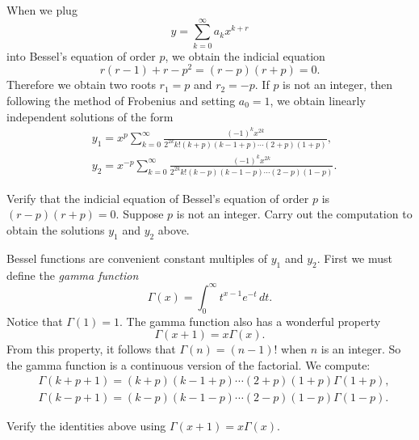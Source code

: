 \documentclass{ximera}
\begin{document}
When we plug
\begin{equation*}
    y = \sum_{k=0}^\infty a_k x^{k+r}
\end{equation*}
into Bessel's equation of order $p$, we obtain the indicial equation
\begin{equation*}
    r(r-1)+r-p^2 = (r-p)(r+p) = 0 .
\end{equation*}
Therefore we obtain two roots $r_1 = p$ and $r_2 = -p$. If $p$ is not an integer, then following the method of Frobenius and setting $a_0 = 1$, we obtain linearly independent solutions of the form
\begin{align*}
    & y_1 = x^p \sum_{k=0}^\infty \frac{{(-1)}^k x^{2k}}{2^{2k} k! (k+p)(k-1+p)\cdots (2+p)(1+p)} , \\
    & y_2 = x^{-p} \sum_{k=0}^\infty \frac{{(-1)}^k x^{2k}}{2^{2k} k! (k-p)(k-1-p)\cdots (2-p)(1-p)} .
\end{align*}

\begin{exercise}
    \begin{tasks}
        \task Verify that the indicial equation of Bessel's equation of order $p$ is $(r-p)(r+p)=0$.
        \task Suppose $p$ is not an integer.  Carry out the computation to obtain the solutions $y_1$ and $y_2$ above.
    \end{tasks}
\end{exercise}

Bessel functions are convenient constant multiples of $y_1$ and $y_2$. First we must define the \emph{gamma function}
\begin{equation*}
    \Gamma(x) = \int_0^\infty t^{x-1} e^{-t} \, dt .
\end{equation*}
Notice that $\Gamma(1) = 1$. The gamma function also has a wonderful property
\begin{equation*}
    \Gamma(x+1) = x \Gamma(x) .
\end{equation*}
From this property, it follows that $\Gamma(n) = (n-1)!$ when $n$ is an integer.  So the gamma function is a continuous version of the factorial.  We compute:
\begin{align*}
    & \Gamma(k+p+1)=(k+p)(k-1+p)\cdots (2+p)(1+p) \Gamma(1+p) ,\\
    & \Gamma(k-p+1)=(k-p)(k-1-p)\cdots (2-p)(1-p) \Gamma(1-p) .
\end{align*}

\begin{exercise}
    Verify the identities above using $\Gamma(x+1) = x \Gamma(x)$.
\end{exercise}
\end{document}
